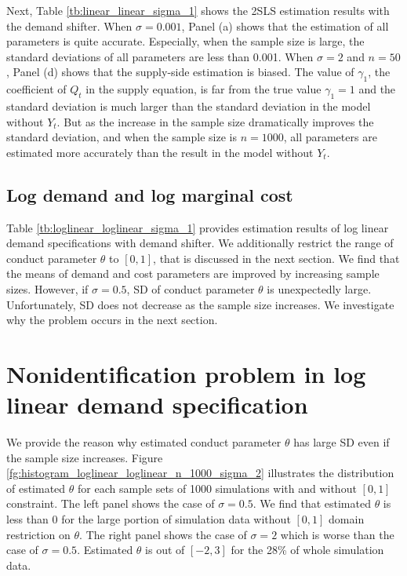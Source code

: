 \documentclass[11pt, a4paper]{article}
\begin{document}
Next, Table \ref{tb:linear_linear_sigma_1} shows the 2SLS estimation results with the demand shifter.
When $\sigma = 0.001$, Panel (a) shows that the estimation of all parameters is quite accurate.
Especially, when the sample size is large, the standard deviations of all parameters are less than 0.001.
When $\sigma = 2$ and $n = 50$, Panel (d) shows that the supply-side estimation is biased.
The value of $\gamma_1$, the coefficient  of $Q_t$ in the supply equation, is far from the true value $\gamma_1 = 1$ and the standard deviation is much larger than the standard deviation in the model without $Y_t$.
But as the increase in the sample size dramatically improves the standard deviation, and when the sample size is $n = 1000$, all parameters are estimated more accurately than the result in the model without $Y_t$.





\subsection{Log demand and log marginal cost}

Table \ref{tb:loglinear_loglinear_sigma_1} provides estimation results of log linear demand specifications with demand shifter. We additionally restrict the range of conduct parameter $\theta$ to $[0,1]$, that is discussed in the next section. We find that the means of demand and cost parameters are improved by increasing sample sizes. However, if $\sigma=0.5$, SD of conduct parameter $\theta$ is unexpectedly large. Unfortunately, SD does not decrease as the sample size increases. We investigate why the problem occurs in the next section.

\section{Nonidentification problem in log linear demand specification}

We provide the reason why estimated conduct parameter $\theta$ has large SD even if the sample size increases. Figure \ref{fg:histogram_loglinear_loglinear_n_1000_sigma_2} illustrates the distribution of estimated $\theta$ for each sample sets of 1000 simulations with and without $[0,1]$ constraint. The left panel shows the case of $\sigma=0.5$. We find that estimated $\theta$ is less than 0 for the large portion of simulation data without $[0,1]$ domain restriction on $\theta$. The right panel shows the case of $\sigma=2$ which is worse than the case of $\sigma=0.5$. Estimated $\theta$ is out of $[-2,3]$ for the 28\% of whole simulation data. 
\end{document}
